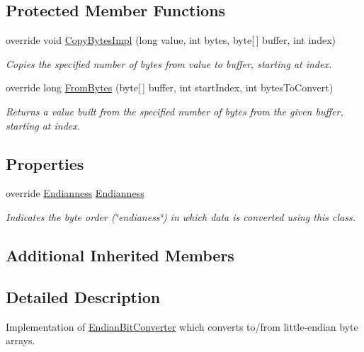 \subsection*{Protected Member Functions}
\begin{DoxyCompactItemize}
\item 
override void \mbox{\hyperlink{class_t_net_1_1_i_o_1_1_little_endian_bit_converter_ae620d0f512b18fc4ddaf7d1225dac136}{Copy\+Bytes\+Impl}} (long value, int bytes, byte\mbox{[}$\,$\mbox{]} buffer, int index)
\begin{DoxyCompactList}\small\item\em Copies the specified number of bytes from value to buffer, starting at index. \end{DoxyCompactList}\item 
override long \mbox{\hyperlink{class_t_net_1_1_i_o_1_1_little_endian_bit_converter_a090b29608a2125db97e02f4a9956eeb2}{From\+Bytes}} (byte\mbox{[}$\,$\mbox{]} buffer, int start\+Index, int bytes\+To\+Convert)
\begin{DoxyCompactList}\small\item\em Returns a value built from the specified number of bytes from the given buffer, starting at index. \end{DoxyCompactList}\end{DoxyCompactItemize}
\subsection*{Properties}
\begin{DoxyCompactItemize}
\item 
override \mbox{\hyperlink{namespace_t_net_1_1_i_o_afd413ccca7a2b11b5a201325685881dc}{Endianness}} \mbox{\hyperlink{class_t_net_1_1_i_o_1_1_little_endian_bit_converter_a72207e7eaf1f6a6b87dd4a8dd1ecbb8c}{Endianness}}
\begin{DoxyCompactList}\small\item\em Indicates the byte order (\char`\"{}endianess\char`\"{}) in which data is converted using this class. \end{DoxyCompactList}\end{DoxyCompactItemize}
\subsection*{Additional Inherited Members}


\subsection{Detailed Description}
Implementation of \mbox{\hyperlink{class_t_net_1_1_i_o_1_1_endian_bit_converter}{Endian\+Bit\+Converter}} which converts to/from little-\/endian byte arrays. 



